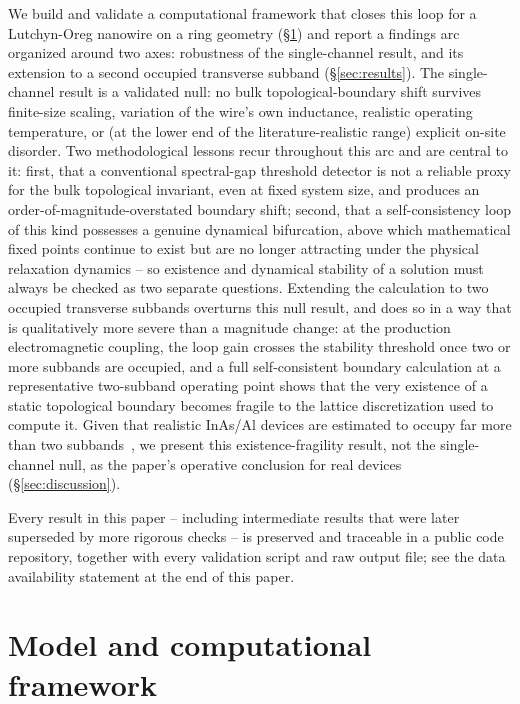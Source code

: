 \documentclass[aps,physrev,reprint,superscriptaddress,amsmath,amssymb,floatfix]{revtex4-2}
\begin{document}
We build and validate a computational framework that closes this loop
for a Lutchyn-Oreg nanowire on a ring geometry (\S\ref{sec:model}) and
report a findings arc organized around two axes: robustness of the
single-channel result, and its extension to a second occupied transverse
subband (\S\ref{sec:results}). The single-channel result is a validated
null: no bulk topological-boundary shift survives finite-size scaling,
variation of the wire's own inductance, realistic operating temperature,
or (at the lower end of the literature-realistic range) explicit on-site
disorder. Two methodological lessons recur throughout this arc and are
central to it: first, that a conventional
spectral-gap threshold detector is not a reliable proxy for the bulk
topological invariant, even at fixed system size, and produces an
order-of-magnitude-overstated boundary shift; second, that a
self-consistency loop of this kind possesses a genuine dynamical
bifurcation, above which mathematical fixed points continue to exist but
are no longer attracting under the physical relaxation dynamics -- so
existence and dynamical stability of a solution must always be checked as
two separate questions. Extending the calculation to two occupied
transverse subbands overturns this null result, and does so in a way that
is qualitatively more severe than a magnitude change: at the production
electromagnetic coupling, the loop gain crosses the stability threshold
once two or more subbands are occupied, and a full self-consistent
boundary calculation at a representative two-subband operating point
shows that the very existence of a static topological boundary becomes
fragile to the lattice discretization used to compute it. Given that
realistic InAs/Al devices are estimated to occupy far more than two
subbands~\cite{woods2020,chang2015}, we present this existence-fragility
result, not the single-channel null, as the paper's operative conclusion
for real devices (\S\ref{sec:discussion}).

Every result in this paper -- including intermediate results that were
later superseded by more rigorous checks -- is preserved and traceable in
a public code repository, together with every validation script and raw
output file; see the data availability statement at the end of this
paper.

\section{Model and computational framework}
\label{sec:model}
\end{document}
